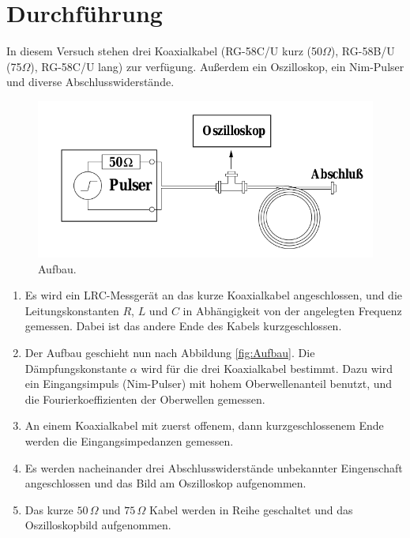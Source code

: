 

\clearpage
\section{Durchführung}
In diesem Versuch stehen drei Koaxialkabel (RG-58C/U kurz (50$\Omega$), RG-58B/U (75$ \Omega$), RG-58C/U lang)
zur
verfügung. Außerdem ein Oszilloskop, ein Nim-Pulser und diverse
Abschlusswiderstände.

\begin{figure}[htpb]
  \centering
  \includegraphics[scale=0.5]{bilder/aufbau.png}
  \caption{Aufbau.\cite{AP}}
\label{fig:aufbau}
\end{figure}

\begin{enumerate}
\item 	Es wird ein LRC-Messgerät an das kurze Koaxialkabel angeschlossen, und die
		Leitungskonstanten $R$, $L$ und $C$ in Abhängigkeit von der angelegten
		Frequenz gemessen. Dabei ist das andere Ende des Kabels kurzgeschlossen.

\item 	Der Aufbau geschieht nun nach Abbildung \ref{fig:Aufbau}.
		Die Dämpfungskonstante $\alpha$ wird für die drei Koaxialkabel bestimmt.
		Dazu wird ein Eingangsimpuls (Nim-Pulser) mit hohem Oberwellenanteil
		benutzt, und die
		Fourierkoeffizienten der Oberwellen gemessen.

\item 	An einem Koaxialkabel mit zuerst offenem, dann kurzgeschlossenem Ende
		werden die Eingangsimpedanzen gemessen.

\item	Es werden
		nacheinander drei Abschlusswiderstände unbekannter Eingenschaft
		angeschlossen und das Bild am Oszilloskop aufgenommen.

\item	Das kurze $50 \,\Omega$ und $75 \, \Omega$ Kabel werden in Reihe geschaltet und
		das	Oszilloskopbild aufgenommen.


\end{enumerate}

